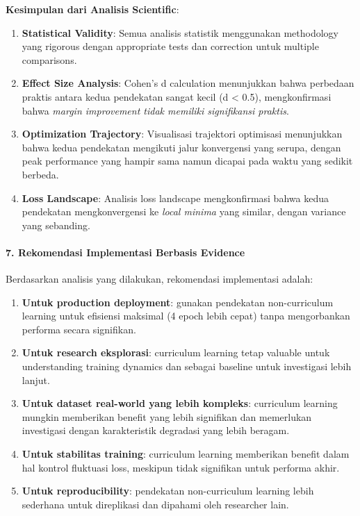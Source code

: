 \documentclass[12pt,a4paper]{article}
\begin{document}
\textbf{Kesimpulan dari Analisis Scientific}:

\begin{enumerate}[leftmargin=*]
\item\textbf{Statistical Validity}: Semua analisis statistik menggunakan methodology yang rigorous dengan appropriate tests dan correction untuk multiple comparisons.

\item\textbf{Effect Size Analysis}: Cohen's d calculation menunjukkan bahwa perbedaan praktis antara kedua pendekatan sangat kecil (d < 0.5), mengkonfirmasi bahwa \textit{margin improvement tidak memiliki signifikansi praktis}.

\item\textbf{Optimization Trajectory}: Visualisasi trajektori optimisasi menunjukkan bahwa kedua pendekatan mengikuti jalur konvergensi yang serupa, dengan peak performance yang hampir sama namun dicapai pada waktu yang sedikit berbeda.

\item\textbf{Loss Landscape}: Analisis loss landscape mengkonfirmasi bahwa kedua pendekatan mengkonvergensi ke \textit{local minima} yang similar, dengan variance yang sebanding.
\end{enumerate}

\paragraph{7. Rekomendasi Implementasi Berbasis Evidence}

Berdasarkan analisis yang dilakukan, rekomendasi implementasi adalah:

\begin{enumerate}[leftmargin=*]
\item\textbf{Untuk production deployment}: gunakan pendekatan non-curriculum learning untuk efisiensi maksimal (4 epoch lebih cepat) tanpa mengorbankan performa secara signifikan.

\item\textbf{Untuk research eksplorasi}: curriculum learning tetap valuable untuk understanding training dynamics dan sebagai baseline untuk investigasi lebih lanjut.

\item\textbf{Untuk dataset real-world yang lebih kompleks}: curriculum learning mungkin memberikan benefit yang lebih signifikan dan memerlukan investigasi dengan karakteristik degradasi yang lebih beragam.

\item\textbf{Untuk stabilitas training}: curriculum learning memberikan benefit dalam hal kontrol fluktuasi loss, meskipun tidak signifikan untuk performa akhir.

\item\textbf{Untuk reproducibility}: pendekatan non-curriculum learning lebih sederhana untuk direplikasi dan dipahami oleh researcher lain.
\end{enumerate}
\end{document}
